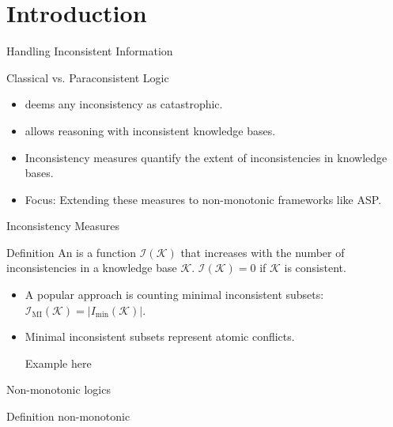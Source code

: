 \section{Introduction}

\begin{frame}{Handling Inconsistent Information}
    \begin{block}{Classical vs. Paraconsistent Logic}
        \begin{itemize}
            \item {} deems any inconsistency as catastrophic.
            \item {} allows reasoning with inconsistent knowledge bases.
        \end{itemize}
    \end{block}
    \begin{itemize}
        \item Inconsistency measures quantify the extent of inconsistencies in knowledge bases.
        \item Focus: Extending these measures to non-monotonic frameworks like ASP.
    \end{itemize}
\end{frame}

\begin{frame}{Inconsistency Measures}
    \begin{block}{Definition}
        An  is a function $\mathcal{I}(\mathcal{K})$ that increases with the number of inconsistencies in a knowledge base $\mathcal{K}$. $\mathcal{I}(\mathcal{K}) = 0$ if $\mathcal{K}$ is consistent.
    \end{block}
    \begin{itemize}
        \item A popular approach is counting minimal inconsistent subsets: $\mathcal{I}_{\text{MI}}(\mathcal{K}) = \left| I_{\min}(\mathcal{K}) \right|$.
        \item Minimal inconsistent subsets represent atomic conflicts.
        \item [Example here]
    \end{itemize}
\end{frame}

\begin{frame}{Non-monotonic logics}
    \begin{block}{Definition}
        non-monotonic
    \end{block}
\end{frame}


